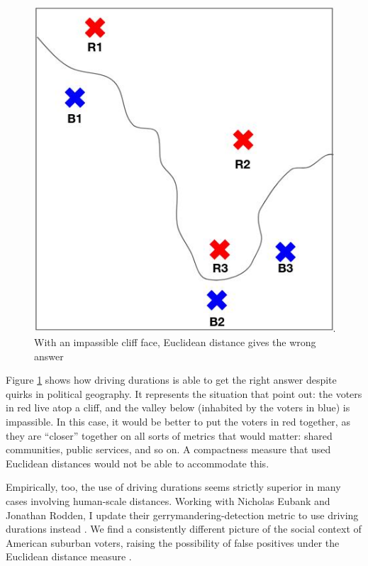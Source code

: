 \documentclass[]{article}
\begin{document}
\begin{figure}
\centering
\includegraphics{./img/hc_impassable.jpg}
\caption{With an impassible cliff face, Euclidean distance gives the
wrong answer \label{hc_impassible}}
\end{figure}

Figure \ref{hc_impassible} shows how driving durations is able to get
the right answer despite quirks in political geography. It represents
the situation that \cite{fh2011} point out: the voters in red live atop
a cliff, and the valley below (inhabited by the voters in blue) is
impassible. In this case, it would be better to put the voters in red
together, as they are ``closer'' together on all sorts of metrics that
would matter: shared communities, public services, and so on. A
compactness measure that used Euclidean distances would not be able to
accommodate this.

Empirically, too, the use of driving durations seems strictly superior
in many cases involving human-scale distances. Working with Nicholas
Eubank and Jonathan Rodden, I update their gerrymandering-detection
metric to use driving durations instead \citep{er2019}. We find a
consistently different picture of the social context of American
suburban voters, raising the possibility of false positives under the
Euclidean distance measure \citep*{elrwp}.
\end{document}
